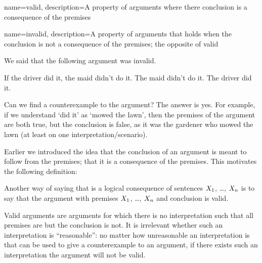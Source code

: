 
{
name=valid,
description={A property of arguments where there conclusion is a consequence of the premises}
}

{
name=invalid,
description={A property of arguments that holds when the conclusion is not a consequence of the premises; the opposite of \gls{valid}}
}

We said that the following argument was invalid.	
\begin{earg}\label{argMaidDriver}
	\prem If the driver did it, the maid didn't do it.
	\prem The maid didn't do it.
	\conc The driver did it.
\end{earg}	
Can we find a counterexample to the argument? The answer is yes. For example, if we understand `did it' as `mowed the lawn', then the premises of the argument are both true, but the conclusion is false, as it was the gardener who mowed the lawn (at least on one interpretation/scenario).

Earlier we introduced the idea that the conclusion of an argument is meant to follow from the premises; that it is a consequence of the premises. This motivates the following definition:


Another way of saying that  \metaY is a logical consequence of sentences $X_1$, \dots, $X_n$ is to say that the argument with premises $X_1$, \dots, $X_n$ and conclusion \metaY is valid.

Valid arguments are arguments for which there is no interpretation such that all premises are but the conclusion is not. It is irrelevant whether such an interpretation is ``reasonable'': no matter how unreasonable an interpretation is that can be used to give a counterexample to an argument, if there exists such an interpretation the argument will not be valid.

